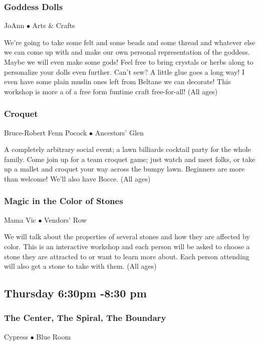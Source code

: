 \subsubsection{Goddess Dolls}
\label{Thu-JoAnn1}
{\small JoAnn $\bullet$  Arts \& Crafts}

 We're going to take some felt and some beads and some thread and whatever else we can come up with and make our own personal representation of the goddess. Maybe we will even make some gods! Feel free to bring crystals or herbs along to personalize your dolls even further. Can't sew? A little glue goes a long way! I even have some plain muslin ones left from Beltane we can decorate! This workshop is more a of a free form funtime craft free-for-all! {\small (All ages)}

\subsubsection{Croquet}
\label{Thu-Croquet}
{\small Bruce-Robert Fenn Pocock $\bullet$  Ancestors' Glen}

 A completely arbitrary social event; a lawn billiards cocktail party for the whole family. Come join up for a team croquet game; just watch and meet folks, or take up a mallet and croquet your way across the bumpy lawn. Beginners are more than welcome! We'll also have Bocce. {\small (All ages)}

\subsubsection{Magic in the Color of Stones}
\label{Thu-magcolor}
{\small Mama Vic $\bullet$  Vendors' Row}

 We will talk about the properties of several stones and how they are affected by color.  This is an interactive workshop and each person will be asked to choose a stone they are attracted to or want to learn more about.  Each person attending will also get a stone to take with them. {\small (All ages)}

\subsection{Thursday 6:30pm -8:30 pm}

\subsubsection{The Center, The Spiral, The Boundary}
\label{Thu-Cypress1}
{\small Cypress $\bullet$  Blue Room}

